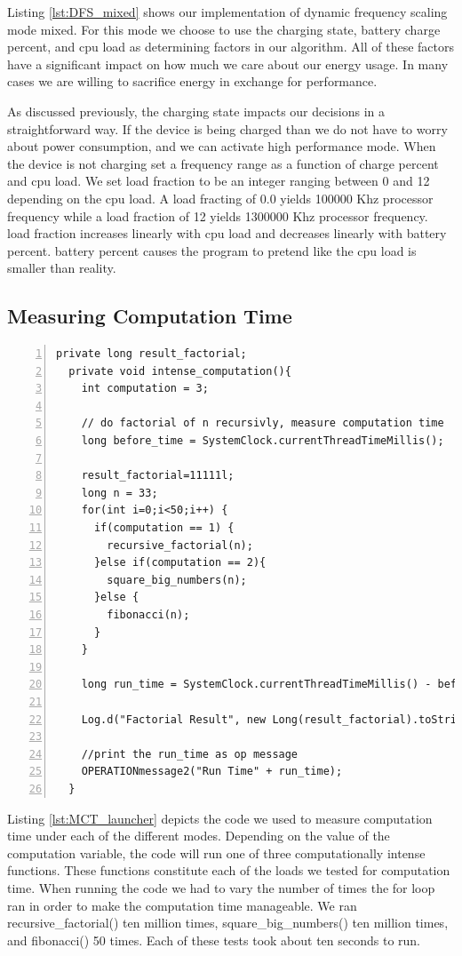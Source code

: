 \documentclass{article} %
\begin{document}
Listing \ref{lst:DFS_mixed} shows our implementation of dynamic frequency scaling mode mixed. For this mode we choose to use the charging state, battery charge percent, and cpu load as determining factors in our algorithm. All of these factors have a significant impact on how much we care about our energy usage. In many cases we are willing to sacrifice energy in exchange for performance.

As discussed previously, the charging state impacts our decisions in a straightforward way. If the device is being charged than we do not have to worry about power consumption, and we can activate high performance mode. When the device is not charging set a frequency range as a function of charge percent and cpu load.
We set load fraction to be an integer ranging between 0 and 12 depending on the cpu load. A load fracting of 0.0 yields 100000 Khz processor frequency while a load fraction of 12 yields 1300000 Khz processor frequency. load fraction increases linearly with cpu load and decreases linearly with battery percent.
battery percent causes the program to pretend like the cpu load is smaller than reality.

\subsection{Measuring Computation Time}
\begin{lstlisting}[caption={Measuring Computation Time - Intense Task Launcher},label={lst:MCT_launcher},numbers=left]
  private long result_factorial;
  private void intense_computation(){
    int computation = 3;

    // do factorial of n recursivly, measure computation time
    long before_time = SystemClock.currentThreadTimeMillis();

    result_factorial=11111l;
    long n = 33;
    for(int i=0;i<50;i++) {
      if(computation == 1) {
        recursive_factorial(n);
      }else if(computation == 2){
        square_big_numbers(n);
      }else {
        fibonacci(n);
      }
    }

    long run_time = SystemClock.currentThreadTimeMillis() - before_time;

    Log.d("Factorial Result", new Long(result_factorial).toString());

    //print the run_time as op message
    OPERATIONmessage2("Run Time" + run_time);
  }
\end{lstlisting}
Listing \ref{lst:MCT_launcher} depicts the code we used to measure computation time under each of the different modes. Depending on the value of the computation variable, the code will run one of three computationally intense functions. These functions constitute each of the loads we tested for computation time. When running the code we had to vary the number of times the for loop ran in order to make the computation time manageable. 
We ran recursive\_factorial() ten million times, square\_big\_numbers() ten million times, and fibonacci() 50 times. Each of these tests took about ten seconds to run.
\end{document}
